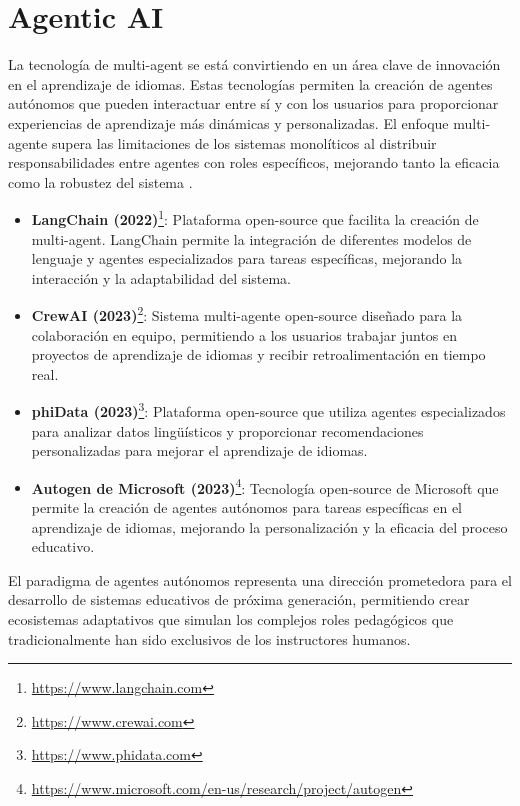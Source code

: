 \section{Agentic AI}
\label{sec:agentic-ai}

La tecnología de \gls{multi-agent} se está convirtiendo en un área clave de innovación en el aprendizaje de idiomas. Estas tecnologías permiten la creación de agentes autónomos que pueden interactuar entre sí y con los usuarios para proporcionar experiencias de aprendizaje más dinámicas y personalizadas. El enfoque multi-agente supera las limitaciones de los sistemas monolíticos al distribuir responsabilidades entre agentes con roles específicos, mejorando tanto la eficacia como la robustez del sistema \cite{Liu2023}.

\begin{itemize}
  \item \textbf{LangChain (2022)}\footnote{\url{https://www.langchain.com}}: Plataforma \gls{open-source} que facilita la creación de \gls{multi-agent}. LangChain permite la integración de diferentes modelos de lenguaje y agentes especializados para tareas específicas, mejorando la interacción y la adaptabilidad del sistema.
  \item \textbf{CrewAI (2023)}\footnote{\url{https://www.crewai.com}}: Sistema multi-agente \gls{open-source} diseñado para la colaboración en equipo, permitiendo a los usuarios trabajar juntos en proyectos de aprendizaje de idiomas y recibir retroalimentación en tiempo real.
  \item \textbf{phiData (2023)}\footnote{\url{https://www.phidata.com}}: Plataforma \gls{open-source} que utiliza agentes especializados para analizar datos lingüísticos y proporcionar recomendaciones personalizadas para mejorar el aprendizaje de idiomas.
  \item \textbf{Autogen de Microsoft (2023)}\footnote{\url{https://www.microsoft.com/en-us/research/project/autogen}}: Tecnología \gls{open-source} de Microsoft que permite la creación de agentes autónomos para tareas específicas en el aprendizaje de idiomas, mejorando la personalización y la eficacia del proceso educativo.
\end{itemize}

El paradigma de agentes autónomos representa una dirección prometedora para el desarrollo de sistemas educativos de próxima generación, permitiendo crear ecosistemas adaptativos que simulan los complejos roles pedagógicos que tradicionalmente han sido exclusivos de los instructores humanos.


